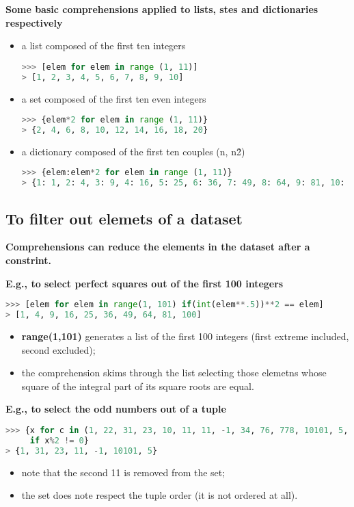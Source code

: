 \textbf{Some basic comprehensions applied to lists, stes and dictionaries respectively}
\begin{itemize}
	\item a list composed of the first ten integers
\begin{lstlisting}[language=Python]
>>> [elem for elem in range (1, 11)]
> [1, 2, 3, 4, 5, 6, 7, 8, 9, 10]
\end{lstlisting}
	\item a set composed of the first ten even integers
\begin{lstlisting}[language=Python]
>>> {elem*2 for elem in range (1, 11)}
> {2, 4, 6, 8, 10, 12, 14, 16, 18, 20}
\end{lstlisting}
	\item a dictionary composed of the first ten couples (n, n\^2)
\begin{lstlisting}[language=Python]
>>> {elem:elem*2 for elem in range (1, 11)}
> {1: 1, 2: 4, 3: 9, 4: 16, 5: 25, 6: 36, 7: 49, 8: 64, 9: 81, 10: 100}
\end{lstlisting}
\end{itemize}

\subsection{To filter out elemets of a dataset}
\textbf{Comprehensions can reduce the elements in the dataset after a constrint.}

\textbf{E.g., to select perfect squares out of the first 100 integers}
\begin{lstlisting}[language=Python]
>>> [elem for elem in range(1, 101) if(int(elem**.5))**2 == elem]
> [1, 4, 9, 16, 25, 36, 49, 64, 81, 100]
\end{lstlisting}
\begin{itemize}
	\item \textbf{range(1,101)} generates a list of the first 100 integers (first extreme included, second excluded);
	\item the comprehension skims through the list selecting those elemetns whose square of the integral part of its square roots are equal.
\end{itemize}
\textbf{E.g., to select the odd numbers out of a tuple}
\begin{lstlisting}[language=Python]
>>> {x for c in (1, 22, 31, 23, 10, 11, 11, -1, 34, 76, 778, 10101, 5, 44) 
     if x%2 != 0}
> {1, 31, 23, 11, -1, 10101, 5}
\end{lstlisting}
\begin{itemize}
	\item note that the second 11 is removed from the set;
	\item the set does note respect the tuple order (it is not ordered at all).
\end{itemize}

